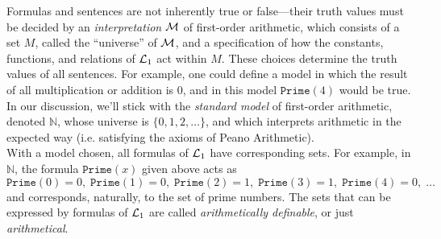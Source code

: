 \documentclass{amsart}
\begin{document}
	Formulas and sentences are not inherently true or false---their truth values must be decided by an \textit{interpretation} $\mathcal{M}$ of first-order arithmetic, which consists of a set $M$, called the ``universe'' of $\mathcal{M}$, and a specification of how the constants, functions, and relations of $\mathcal{L}_1$ act within $M$. These choices determine the truth values of all sentences. For example, one could define a model in which the result of all multiplication or addition is $0$, and in this model $\mathtt{Prime}(4)$ would be true. In our discussion, we'll stick with the \textit{standard model} of first-order arithmetic, denoted $\mathbb{N}$, whose universe is $\{0,1,2,\dots\}$, and which interprets arithmetic in the expected way (i.e. satisfying the axioms of Peano Arithmetic).\\
	\indent With a model chosen, all formulas of $\mathcal{L}_1$ have corresponding sets. For example, in $\mathbb{N}$, the formula $\mathtt{Prime}(x)$ given above acts as 
	$$
	\mathtt{Prime}(0) = 0, \; \mathtt{Prime}(1) = 0, \; \mathtt{Prime}(2) = 1, \; \mathtt{Prime}(3) = 1,\; \mathtt{Prime}(4) = 0, \; \dots
	$$
	and corresponds, naturally, to the set of prime numbers. The sets that can be expressed by formulas of $\mathcal{L}_1$ are called \textit{arithmetically definable}, or just \textit{arithmetical}.\\
	
\end{document}
